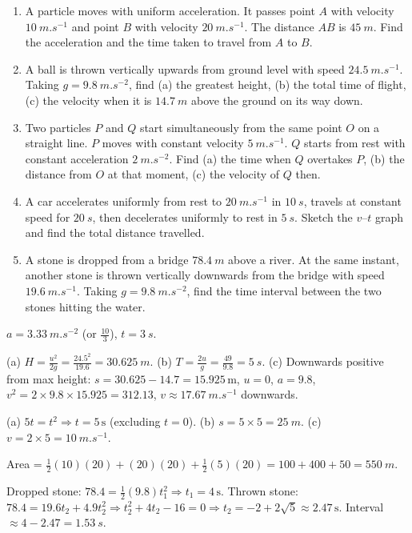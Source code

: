 \documentclass[11pt]{article}
\begin{document}
\begin{exercice}
\begin{enumerate}
\item A particle moves with uniform acceleration. It passes point $A$ with velocity $\SI{10}{m.s^{-1}}$ and point $B$ with velocity $\SI{20}{m.s^{-1}}$. The distance $AB$ is $\SI{45}{m}$. Find the acceleration and the time taken to travel from $A$ to $B$.
\item A ball is thrown vertically upwards from ground level with speed $\SI{24.5}{m.s^{-1}}$. Taking $g=\SI{9.8}{m.s^{-2}}$, find (a) the greatest height, (b) the total time of flight, (c) the velocity when it is $\SI{14.7}{m}$ above the ground on its way down.
\item Two particles $P$ and $Q$ start simultaneously from the same point $O$ on a straight line. $P$ moves with constant velocity $\SI{5}{m.s^{-1}}$. $Q$ starts from rest with constant acceleration $\SI{2}{m.s^{-2}}$. Find (a) the time when $Q$ overtakes $P$, (b) the distance from $O$ at that moment, (c) the velocity of $Q$ then.
\item A car accelerates uniformly from rest to $\SI{20}{m.s^{-1}}$ in $\SI{10}{s}$, travels at constant speed for $\SI{20}{s}$, then decelerates uniformly to rest in $\SI{5}{s}$. Sketch the $v$–$t$ graph and find the total distance travelled.
\item A stone is dropped from a bridge $\SI{78.4}{m}$ above a river. At the same instant, another stone is thrown vertically downwards from the bridge with speed $\SI{19.6}{m.s^{-1}}$. Taking $g=\SI{9.8}{m.s^{-2}}$, find the time interval between the two stones hitting the water.
\end{enumerate}
\end{exercice}

\begin{corrige}[Exercise 1]
$a = \SI{3.33}{m.s^{-2}}$ (or $\frac{10}{3}$), $t = \SI{3}{s}$.
\end{corrige}
\begin{corrige}[Exercise 2]
(a) $H = \frac{u^2}{2g} = \frac{24.5^2}{19.6} = \SI{30.625}{m}$. (b) $T = \frac{2u}{g} = \frac{49}{9.8} = \SI{5}{s}$. (c) Downwards positive from max height: $s = 30.625 - 14.7 = 15.925\,\text{m}$, $u=0$, $a=9.8$, $v^2 = 2\times9.8\times15.925 = 312.13$, $v \approx \SI{17.67}{m.s^{-1}}$ downwards.
\end{corrige}
\begin{corrige}[Exercise 3]
(a) $5t = t^2 \Rightarrow t=5\,\text{s}$ (excluding $t=0$). (b) $s = 5\times5 = \SI{25}{m}$. (c) $v = 2\times5 = \SI{10}{m.s^{-1}}$.
\end{corrige}
\begin{corrige}[Exercise 4]
Area = $\frac12(10)(20) + (20)(20) + \frac12(5)(20) = 100 + 400 + 50 = \SI{550}{m}$.
\end{corrige}
\begin{corrige}[Exercise 5]
Dropped stone: $78.4 = \frac12(9.8)t_1^2 \Rightarrow t_1 = 4\,\text{s}$. Thrown stone: $78.4 = 19.6t_2 + 4.9t_2^2 \Rightarrow t_2^2 + 4t_2 - 16 = 0 \Rightarrow t_2 = -2 + 2\sqrt{5} \approx 2.47\,\text{s}$. Interval $\approx 4 - 2.47 = \SI{1.53}{s}$.
\end{corrige}
\end{document}
